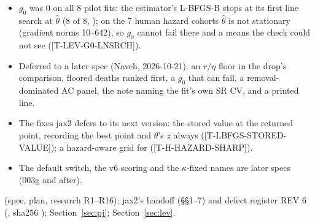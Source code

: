 \tplIssues
\begin{itemize}[nosep]
  \item $g_0$ was 0 on all 8 pilot fits: the estimator's L-BFGS-B stops at its first line search at $\hat\theta$ (8 of
    8, ); on the 7 human hazard cohorts $\hat\theta$ is not stationary
    (gradient norms 10--642), so $g_0$ cannot fail there and a  means the check could not see
    ([T-LEV-G0-LNSRCH]).
  \item Deferred to a later spec (Naveh, 2026-10-21): an $\bar r/\eta$ floor in the drop's comparison, floored deaths
    ranked first, a $g_0$ that can fail, a removal-dominated AC panel, the  note naming the fit's own SR CV, and
    a printed  line.
  \item The fixes jax2 defers to its next version: the stored value at the returned point, recording the best point and
    $\hat\theta$'s $z$ always ([T-LBFGS-STORED-VALUE]); a hazard-aware grid for  ([T-H-HAZARD-SHARP]).
  \item The default switch, the v6 scoring and the $\kappa$-fixed names are later specs (003g and after).
\end{itemize}

\tplRefs
{} (spec, plan, research R1--R16); jax2's handoff (\S\S1--7) and defect register REV 6
(, sha256 ); Section~\ref{sec:pj}; Section~\ref{sec:lev}.
